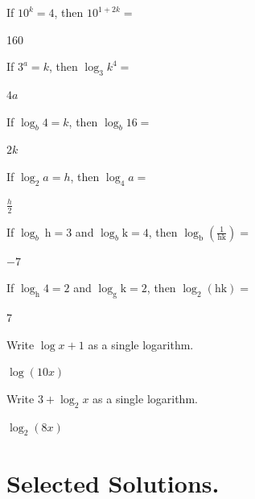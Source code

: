 \documentclass[12pt,fleqn]{book}
\newcommand{\prb}[1]{\begin{Exercise}#1\end{Exercise}}
\newcommand{\sol}[1]{\begin{Answer}#1\end{Answer}}
\begin{document}
\clearpage
\prb {If $10^k=4$, then $10^{1+2 k}=$\\[2in]}
\sol{160}
\prb {If $3^a=k$, then $\log _3 k^4=$\\[2in]}
\sol{$4a$}
\prb {If $\log _b 4=k$, then $\log _b 16=$\\[2in]}
\sol{$2k$}
\prb {If $\log _2 a=h$, then $\log _4 a=$\\[2in]}
\sol{$\frac h2$}
\prb {If $\log _b \mathrm{~h}=3$ and $\log _b \mathrm{k}=4$, then $\log _{\mathrm{b}}\left(\frac{1}{\mathrm{hk}}\right)=$\\[2in]}
\sol{$-7$ }
\prb {If $\log _{\mathrm{h}} 4=2$ and $\log _{\mathrm{g}} \mathrm{k}=2$, then $\log _2(\mathrm{hk})=$\\[2in]}
\sol{7 }
\prb {Write $\log x+1$ as a single logarithm.\\[2in]}
\sol{$\log(10x)$ }
\prb {Write $3+\log _2 x$ as a single logarithm.\\[2in]}
\sol{ $\log_2(8x)$}
\chapter{Selected Solutions.}
\shipoutAnswer
\end{document}
